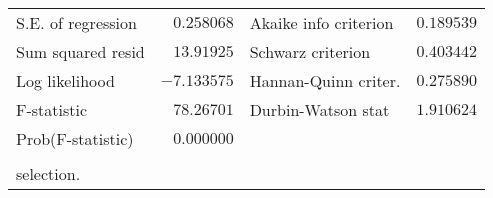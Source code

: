 \begin{tabular}{lrrrr}
\multicolumn{1}{l}{S.E. of regression}&\multicolumn{1}{r}{$0.258068$}&\multicolumn{2}{l}{Akaike info criterion}&\multicolumn{1}{r}{$0.189539$}\\
\multicolumn{1}{l}{Sum squared resid}&\multicolumn{1}{r}{$13.91925$}&\multicolumn{2}{l}{Schwarz criterion}&\multicolumn{1}{r}{$0.403442$}\\
\multicolumn{1}{l}{Log likelihood}&\multicolumn{1}{r}{$-7.133575$}&\multicolumn{2}{l}{Hannan-Quinn criter.}&\multicolumn{1}{r}{$0.275890$}\\
\multicolumn{1}{l}{F-statistic}&\multicolumn{1}{r}{$78.26701$}&\multicolumn{2}{l}{Durbin-Watson stat}&\multicolumn{1}{r}{$1.910624$}\\
\multicolumn{1}{l}{Prob(F-statistic)}&\multicolumn{1}{r}{$0.000000$}&\multicolumn{1}{c}{}&\multicolumn{1}{c}{}&\multicolumn{1}{c}{}\\
[4.5pt] \hline \\ [-4.5pt]
\multicolumn{1}{l}{selection.}&\multicolumn{1}{c}{}&\multicolumn{1}{c}{}&\multicolumn{1}{c}{}&\multicolumn{1}{c}{}\\
\end{tabular}